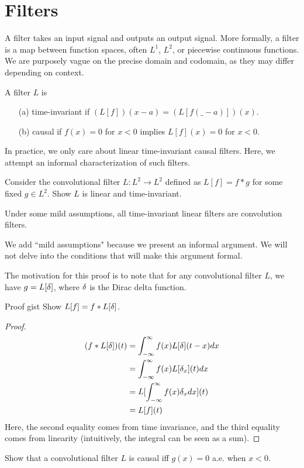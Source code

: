 \section{Filters}
A filter takes an input signal and outputs an output signal. More formally, a filter is a map between function spaces, often $L^1$, $L^2$, or piecewise continuous functions. We are purposely vague on the precise domain and codomain, as they may differ depending on context.
\begin{dfn}
    A filter $L$ is
    \begin{itemize}
        \item[(a)] time-invariant if $(L[f])(x-a) = (L[f(\_-a)])(x)$.
        \item[(b)] causal if $f(x) = 0$ for $x < 0$ implies $L[f](x) = 0$ for $x < 0$.
    \end{itemize}
\end{dfn}
In practice, we only care about linear time-invariant causal filters. Here, we attempt an informal characterization of such filters.
\begin{exercise}
    Consider the convolutional filter $L: L^2 \rightarrow L^2$ defined as $L[f] = f * g$ for some fixed $g \in L^2$. Show $L$ is linear and time-invariant.
\end{exercise}
\begin{thm}
    Under some mild assumptions, all time-invariant linear filters are convolution filters.
\end{thm}
\begin{remark}
    We add ``mild assumptions" because we present an informal argument. We will not delve into the conditions that will make this argument formal.
\end{remark}
The motivation for this proof is to note that for any convolutional filter $L$, we have $g = L[\delta]$, where $\delta$ is the Dirac delta function.
\begin{details}{Proof gist}
    Show $L[f] = f * L[\delta]$.
\end{details}
\begin{proof}
    \[
        \begin{split}
            (f * L[\delta])(t) &= \int_{-\infty}^\infty f(x)L[\delta](t-x)dx\\
                           &= \int_{-\infty}^\infty f(x)L[\delta_x](t)dx\\
                           &= L[\int_{-\infty}^{\infty} f(x)\delta_xdx](t)\\
                           &= L[f](t)
        \end{split}
    \]
    Here, the second equality comes from time invariance, and the third equality comes from linearity (intuitively, the integral can be seen as a sum).
\end{proof}
\begin{exercise}
    Show that a convolutional filter $L$ is causal iff $g(x) = 0$ a.e. when $x < 0$.
\end{exercise}

